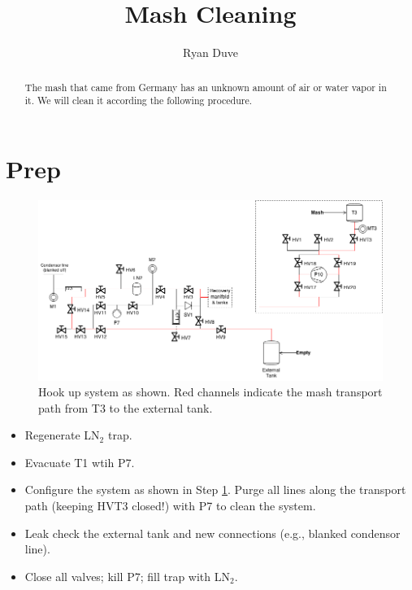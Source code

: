 \documentclass[a4paper,10pt]{article}
\title{Mash Cleaning}
\author{Ryan Duve}
\begin{document}
\maketitle

\begin{abstract}
\vspace{.1cm}
\vspace{.1cm}

The mash that came from Germany has an unknown amount of air or water vapor in it.  We will clean it according the following procedure.

\end{abstract}

\section{Prep}
\begin{figure}[htbp!]
 \centering
 \includegraphics[width=\textwidth]{./mash-cleaning-schematic-1.png}
 \caption{Hook up system as shown.  Red channels indicate the mash transport path from T3 to the external tank.}
 \label{a}
\end{figure}

\begin{itemize}
 \item Regenerate LN$_2$ trap.
 \item Evacuate T1 wtih P7.
 \item Configure the system as shown in Step \ref{a}. Purge all lines along the transport path (keeping HVT3 closed!) with P7 to clean the system.
 \item Leak check the external tank and new connections (e.g., blanked condensor line).
 \item Close all valves; kill P7; fill trap with LN$_2$.
\end{itemize}
\end{document}
